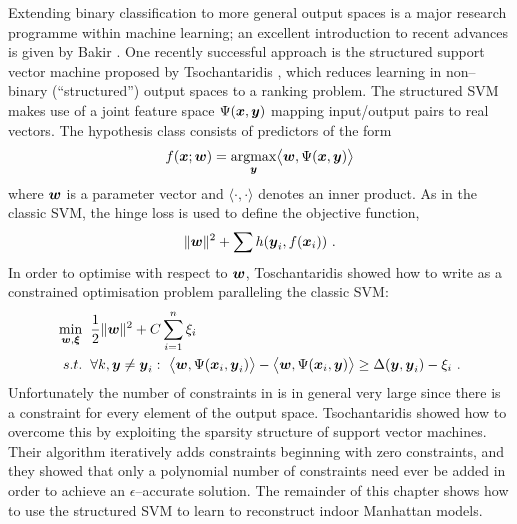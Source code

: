 Extending binary classification to more general output spaces is a
major research programme within machine learning; an excellent
introduction to recent advances is given by Bakir \etal
\cite{Bakir07}. One recently successful approach is the structured
support vector machine proposed by Tsochantaridis \etal
\cite{Tsochantaridis04}, which reduces learning in non--binary
(``structured'') output spaces to a ranking problem. The structured
SVM makes use of a joint feature space $\JointFtr(\inp,\outp)$ mapping
input/output pairs to real vectors. The hypothesis class consists of
predictors of the form
\begin{equation}
  \Predictor(\inp;\Model) 
  = 
  \argmax_{\outp}\limits 
  \bigl\langle \Model, \JointFtr(\inp,\outp) \bigr\rangle
  \label{eq:linear-max}
\end{equation}
where $\Model$ is a parameter vector and $\langle\cdot,\cdot\rangle$
denotes an inner product. As in the classic SVM, the hinge loss is
used to define the objective function,
\begin{equation}
  \label{eq:first-ssvm}
  \|\Model\|^2 + \sum h(\outp_i, \Predictor(\inp_i)) ~.
\end{equation}
In order to optimise with respect to $\Model$, Toschantaridis \etal
showed how to write  as a constrained optimisation
problem paralleling the classic SVM:
\begin{equation}
  \begin{split}
    \min_{\Model,\Slacks} &
      \hspace{2mm} 
    \frac{1}{2} \|\Model\|^2 +
      C \sum_{i=1}^n \Slack_i\\
    s.t. & \hspace{2mm} 
      \forall k, \outp \neq \outp_i:~
        \bigl\langle\Model, \JointFtr(\inp_i,\outp_i)\bigr\rangle -
        \bigl\langle\Model, \JointFtr(\inp_i,\outp)\bigr\rangle
      \geq
        \Loss(\outp,\outp_i) - \Slack_i ~.
  \end{split}
  \label{eq:ssvm}
\end{equation}
Unfortunately the number of constraints in  is in general
very large since there is a constraint for every element of the output
space. Tsochantaridis \etal \cite{Tsochantaridis04} showed how to
overcome this by exploiting the sparsity structure of support vector
machines. Their algorithm iteratively adds constraints beginning with
zero constraints, and they showed that only a polynomial number of
constraints need ever be added in order to achieve an
$\epsilon$--accurate solution. The remainder of this chapter shows how
to use the structured SVM to learn to reconstruct indoor Manhattan
models.

